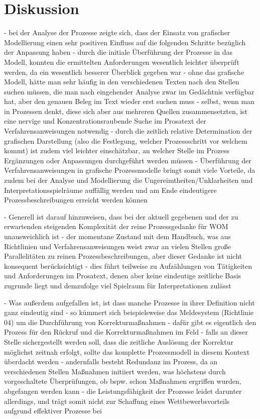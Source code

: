 \documentclass[a4paper,12pt]{report}
\begin{document}
\chapter{Diskussion}\label{chap:Diskussion}
- bei der Analyse der Prozesse zeigte sich, dass der Einsatz von grafischer Modellierung einen sehr positiven Einfluss auf die folgenden Schritte bezüglich der Anpassung haben
- durch die initiale Überführung der Prozesse in das Modell, konnten die ermittelten Anforderungen wesentlich leichter überprüft werden, da ein wesentlich besserer Überblick gegeben war
- ohne das grafische Modell, hätte man sehr häufig in den verschiedenen Texten nach den Stellen suchen müssen, die man nach eingehender Analyse zwar im Gedächtnis verfügbar hat, aber den genauen Beleg im Text wieder erst suchen muss
- selbst, wenn man in Prozessen denkt, diese sich aber aus mehreren Quellen zusammensetzten, ist eine nervige und Konzentrationsraubende Suche im Prosatext der Verfahrensanweisungen notwendig
- durch die zeitlich relative Determination der grafischen Darstellung (also die Festlegung, welcher Prozessschritt vor welchem kommt) ist zudem viel leichter einschätzbar, an welcher Stelle im Prozess Ergänzungen oder Anpassungen durchgeführt werden müssen
- Überführung der Verfahrensanweisungen in grafische Prozessmodelle bringt somit viele Vorteile, da zudem bei der Analyse und Modellierung die Ungereimtheiten/Unklarheiten und Interpretationsspielräume auffällig werden und am Ende eindeutigere Prozessbeschreibungen erreicht werden können

- Generell ist darauf hinzuweisen, dass bei der aktuell gegebenen und der zu erwartenden steigenden Komplexität der reine Prozessgedanke für WOM unausweichlich ist
- der momentane Zustand mit dem Handbuch, was aus Richtlinien und Verfahrensanweisungen weist zwar an vielen Stellen große Parallelitäten zu reinen Prozessbeschreibungen, aber dieser Gedanke ist nicht konsequent berücksichtigt
- dies führt teilweise zu Aufzählungen von Tätigkeiten und Anforderungen im Prosatext, denen aber keine eindeutige zeitliche Basis zugrunde liegt und demzufolge viel Spielraum für Interpretationen zulässt

- Was außerdem aufgefallen ist, ist dass manche Prozesse in ihrer Definition nicht ganz eindeutig sind
- so kümmert sich beispielsweise das Meldesystem (Richtlinie 04) um die Durchführung von Korrekturmaßnahmen
- dafür gibt es eigentlich den Prozess für den Rückruf und die Korrekturmaßnahmen im Feld
- falls an dieser Stelle sichergestellt werden soll, dass die zeitliche Auslösung der Korrektur möglichst zeitnah erfolgt, sollte das komplette Prozessmodell in diesem Kontext überdacht werden
- andernfalls besteht Redundanz im Prozess, da an verschiedenen Stellen Maßnahmen initiiert werden, was höchstens durch vorgeschaltete Überprüfungen, ob bspw. schon Maßnahmen ergriffen wurden, abgefangen werden kann
- die Leistungsfähigkeit der Prozesse leidet darunter allerdings, und trägt somit nicht zur Schaffung eines Wettbewerbsvorteils aufgrund effektiver Prozesse bei
\end{document}
